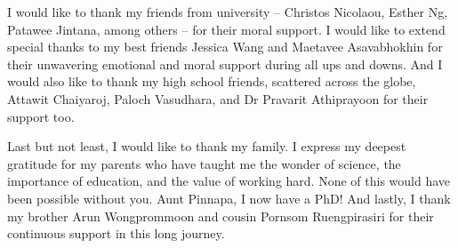 {  I would like to thank my friends from university -- Christos Nicolaou, Esther Ng, Patawee Jintana, among others -- for their moral support.
  I would like to extend special thanks to my best friends Jessica Wang and Maetavee Asavabhokhin for their unwavering emotional and moral support during all ups and downs.
  And I would also like to thank my high school friends, scattered across the globe, Attawit Chaiyaroj, Paloch Vasudhara, and Dr Pravarit Athiprayoon for their support too.

  Last but not least, I would like to thank my family.
  I express my deepest gratitude for my parents who have taught me the wonder of science, the importance of education, and the value of working hard.
  None of this would have been possible without you.
  Aunt Pinnapa, I now have a PhD!
  And lastly, I thank my brother Arun Wongprommoon and cousin Pornsom Ruengpirasiri for their continuous support in this long journey.
}






